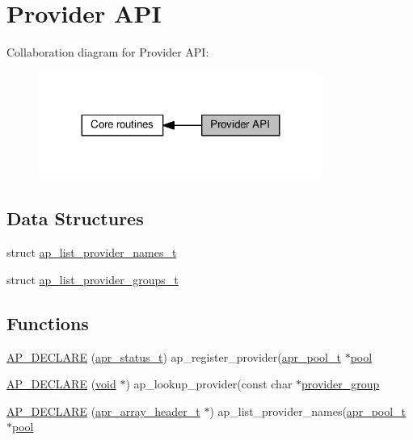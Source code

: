 \hypertarget{group__APACHE__CORE__PROVIDER}{}\section{Provider A\+PI}
\label{group__APACHE__CORE__PROVIDER}
Collaboration diagram for Provider A\+PI\+:
\nopagebreak
\begin{figure}[H]
\begin{center}
\leavevmode
\includegraphics[width=263pt]{group__APACHE__CORE__PROVIDER}
\end{center}
\end{figure}
\subsection*{Data Structures}
\begin{DoxyCompactItemize}
\item 
struct \hyperlink{structap__list__provider__names__t}{ap\+\_\+list\+\_\+provider\+\_\+names\+\_\+t}
\item 
struct \hyperlink{structap__list__provider__groups__t}{ap\+\_\+list\+\_\+provider\+\_\+groups\+\_\+t}
\end{DoxyCompactItemize}
\subsection*{Functions}
\begin{DoxyCompactItemize}
\item 
\hyperlink{group__APACHE__CORE__PROVIDER_gadc1bf9ede7555b74a58240a45dc190da}{A\+P\+\_\+\+D\+E\+C\+L\+A\+RE} (\hyperlink{group__apr__errno_gaa5105fa83cc322f09382292db8b47593}{apr\+\_\+status\+\_\+t}) ap\+\_\+register\+\_\+provider(\hyperlink{structapr__pool__t}{apr\+\_\+pool\+\_\+t} $\ast$\hyperlink{group__APR__XLATE_gabb3cd978f04c73d0b763c391e9bfde73}{pool}
\item 
\hyperlink{group__APACHE__CORE__PROVIDER_ga965f3933dc6fb04f400cea9ba467a315}{A\+P\+\_\+\+D\+E\+C\+L\+A\+RE} (\hyperlink{group__MOD__ISAPI_gacd6cdbf73df3d9eed42fa493d9b621a6}{void} $\ast$) ap\+\_\+lookup\+\_\+provider(const char $\ast$\hyperlink{group__APACHE__CORE__REQ__AUTH_gaa7cfcf67c811adf57cf09ae7c5a60f0f}{provider\+\_\+group}
\item 
\hyperlink{group__APACHE__CORE__PROVIDER_ga775e7457699e3418d17350dc650428a0}{A\+P\+\_\+\+D\+E\+C\+L\+A\+RE} (\hyperlink{structapr__array__header__t}{apr\+\_\+array\+\_\+header\+\_\+t} $\ast$) ap\+\_\+list\+\_\+provider\+\_\+names(\hyperlink{structapr__pool__t}{apr\+\_\+pool\+\_\+t} $\ast$\hyperlink{group__APR__XLATE_gabb3cd978f04c73d0b763c391e9bfde73}{pool}
\end{DoxyCompactItemize}
